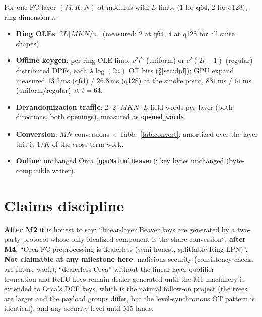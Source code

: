 \documentclass[11pt]{article}
\begin{document}
For one FC layer $(M, K, N)$ at modulus with $L$ limbs (1 for q64, 2 for
q128), ring dimension $n$:

\begin{itemize}[leftmargin=2em]
\item \textbf{Ring OLEs}: $2 L \lceil MKN/n \rceil$ (measured: 2 at q64,
  4 at q128 for all suite shapes).
\item \textbf{Offline keygen}: per ring OLE limb, $c^2 t^2$ (uniform) or
  $c^2(2t-1)$ (regular) distributed DPFs, each $\lambda \log(2n)$ OT bits
  (\S\ref{sec:dpf}); GPU expand measured $13.3$\,ms (q64) / $26.8$\,ms (q128)
  at the smoke point, $881$\,ms / $61$\,ms (uniform/regular) at $t{=}64$.
\item \textbf{Derandomization traffic}: $2 \cdot 2 \cdot MKN \cdot L$ field
  words per layer (both directions, both openings), measured as
  \texttt{opened\_words}.
\item \textbf{Conversion}: $MN$ conversions $\times$ Table~\ref{tab:convert};
  amortized over the layer this is $1/K$ of the cross-term work.
\item \textbf{Online}: unchanged Orca (\texttt{gpuMatmulBeaver}); key bytes
  unchanged (byte-compatible writer).
\end{itemize}

\section{Claims discipline}
\label{sec:scope}

\textbf{After M2} it is honest to say: ``linear-layer Beaver keys are
generated by a two-party protocol whose only idealized component is the share
conversion''; \textbf{after M4}: ``Orca FC preprocessing is dealerless
(semi-honest, splittable Ring-LPN)''. \textbf{Not claimable at any milestone
here}: malicious security (consistency checks are future work);
``dealerless Orca'' without the linear-layer qualifier --- truncation and
ReLU keys remain dealer-generated until the M1 machinery is extended to
Orca's DCF keys, which is the natural follow-on project (the trees are
larger and the payload groups differ, but the level-synchronous OT pattern
is identical); and any security level until M5 lands.
\end{document}
